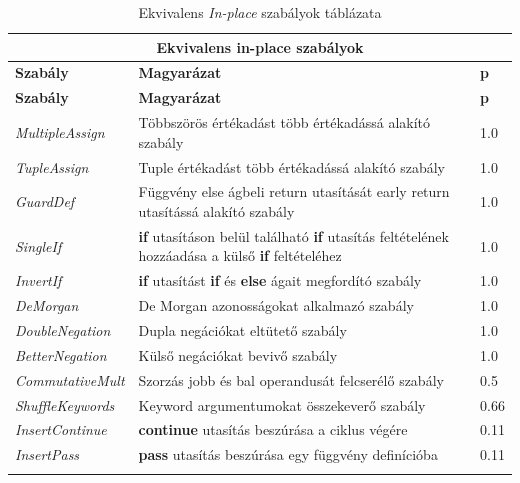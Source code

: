 \begin{center}
	\begin{longtable}{ | p{} | p{} | p{} | }
		\hline
		\multicolumn{3}{|c|}{\textbf{Ekvivalens in-place szabályok}}
		\\ \hline
		
		\textbf{Szabály} & \textbf{Magyarázat} & \textbf{p}
		\\ \hline \hline
		\endfirsthead %
		
		\hline
		\textbf{Szabály} & \textbf{Magyarázat} & \textbf{p}
		\\ \hline \hline
		\endhead %
		
		\hline
		\endfoot %
		
		\endlastfoot %
		
		\emph{MultipleAssign}
		& Többszörös értékadást több értékadássá alakító szabály
		& 1.0
		\\ \hline

		\emph{TupleAssign}
		& Tuple értékadást több értékadássá alakító szabály
		& 1.0
		\\ \hline

		\emph{GuardDef}
		& Függvény else ágbeli return utasítását early return utasítássá alakító szabály
		& 1.0
		\\ \hline

		\emph{SingleIf}
		& \textbf{if} utasításon belül található \textbf{if} utasítás feltételének hozzáadása a külső \textbf{if} feltételéhez
		& 1.0
		\\ \hline
		
		\emph{InvertIf}
		& \textbf{if} utasítást \textbf{if} és \textbf{else} ágait megfordító szabály
		& 1.0
		\\ \hline

		\emph{DeMorgan}
		& De Morgan azonosságokat alkalmazó szabály
		& 1.0
		\\ \hline

		\emph{DoubleNegation}
		& Dupla negációkat eltütető szabály
		& 1.0
		\\ \hline

		\emph{BetterNegation}
		& Külső negációkat bevivő szabály
		& 1.0
		\\ \hline

		\emph{CommutativeMult}
		& Szorzás jobb és bal operandusát felcserélő szabály
		& 0.5
		\\ \hline

		\emph{ShuffleKeywords}
		& Keyword argumentumokat összekeverő szabály
		& 0.66
		\\ \hline

		\emph{InsertContinue}
		& \textbf{continue} utasítás beszúrása a ciklus végére
		& 0.11
		\\ \hline

		\emph{InsertPass}
		& \textbf{pass} utasítás beszúrása egy függvény definícióba
		& 0.11
		\\ \hline

		\caption{Ekvivalens \emph{In-place} szabályok táblázata}
		\label{tab:in-place-rules-eqv}
	\end{longtable}
\end{center}

